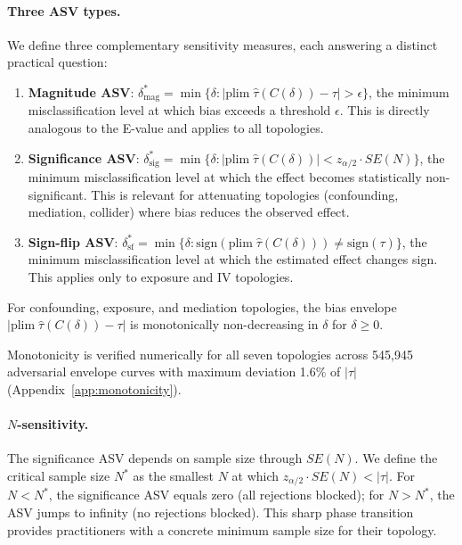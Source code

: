 \paragraph{Three ASV types.}
We define three complementary sensitivity measures, each answering a distinct practical question:

\begin{enumerate}
\item \textbf{Magnitude ASV}: $\delta^*_{\text{mag}} = \min\{\delta : |\text{plim}\;\hat{\tau}(C(\delta)) - \tau| > \epsilon\}$, the minimum misclassification level at which bias exceeds a threshold $\epsilon$. This is directly analogous to the E-value and applies to all topologies.

\item \textbf{Significance ASV}: $\delta^*_{\text{sig}} = \min\{\delta : |\text{plim}\;\hat{\tau}(C(\delta))| < z_{\alpha/2} \cdot SE(N)\}$, the minimum misclassification level at which the effect becomes statistically non-significant. This is relevant for attenuating topologies (confounding, mediation, collider) where bias reduces the observed effect.

\item \textbf{Sign-flip ASV}: $\delta^*_{\text{sf}} = \min\{\delta : \text{sign}(\text{plim}\;\hat{\tau}(C(\delta))) \neq \text{sign}(\tau)\}$, the minimum misclassification level at which the estimated effect changes sign. This applies only to exposure and IV topologies.
\end{enumerate}

\begin{theorem}
\label{thm:monotone}
For confounding, exposure, and mediation topologies, the bias envelope $|\text{plim}\;\hat{\tau}(C(\delta)) - \tau|$ is monotonically non-decreasing in $\delta$ for $\delta \geq 0$.
\end{theorem}

Monotonicity is verified numerically for all seven topologies across 545{,}945 adversarial envelope curves with maximum deviation 1.6\% of $|\tau|$ (Appendix~\ref{app:monotonicity}).

\paragraph{$N$-sensitivity.}
The significance ASV depends on sample size through $SE(N)$. We define the critical sample size $N^*$ as the smallest $N$ at which $z_{\alpha/2} \cdot SE(N) < |\tau|$. For $N < N^*$, the significance ASV equals zero (all rejections blocked); for $N > N^*$, the ASV jumps to infinity (no rejections blocked). This sharp phase transition provides practitioners with a concrete minimum sample size for their topology.

